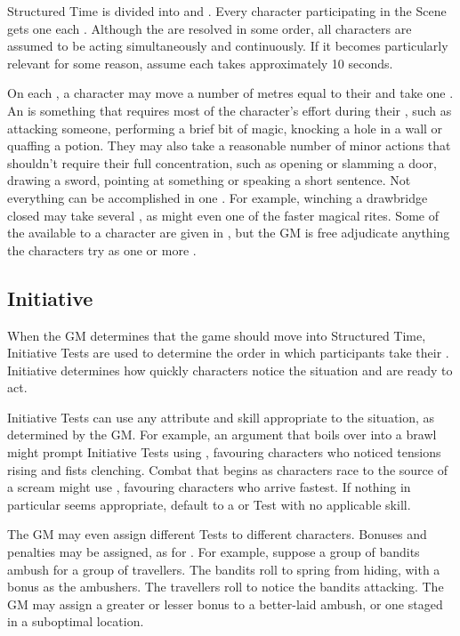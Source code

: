 Structured Time is divided into {\rounds} and {\turns}.
Every character participating in the Scene gets one {\turn} each {\round}.
Although the {\turns} are resolved in some order, all characters are assumed to be acting simultaneously and continuously.
If it becomes particularly relevant for some reason, assume each {\round} takes approximately 10 seconds.

On each {\turn}, a character may move a number of metres equal to their  and take one {\action}.
An {\action} is something that requires most of the character's effort during their {\turn}, such as attacking someone, performing a brief bit of magic, knocking a hole in a wall or quaffing a potion.
They may also take a reasonable number of minor actions that shouldn't require their full concentration, such as opening or slamming a door, drawing a sword, pointing at something or speaking a short sentence.
Not everything can be accomplished in one {\action}.
For example, winching a drawbridge closed may take several {\actions}, as might even one of the faster magical rites.
Some of the {\actions} available to a character are given in , but the GM is free adjudicate anything the characters try as one or more {\actions}.

\subsection{Initiative}

When the GM determines that the game should move into Structured Time, Initiative Tests are used to determine the order in which participants take their {\turns}.
Initiative determines how quickly characters notice the situation and are ready to act.

Initiative Tests can use any attribute and skill appropriate to the situation, as determined by the GM.
For example, an argument that boils over into a brawl might prompt Initiative Tests using , favouring characters who noticed tensions rising and fists clenching.
Combat that begins as characters race to the source of a scream might use , favouring characters who arrive fastest.
If nothing in particular seems appropriate, default to a  or  Test with no applicable skill.

The GM may even assign different Tests to different characters.
Bonuses and penalties may be assigned, as for {\opposedtests}.
For example, suppose a group of bandits ambush for a group of travellers.
The bandits roll  to spring from hiding, with a  bonus as the ambushers.
The travellers roll  to notice the bandits attacking.
The GM may assign a greater or lesser bonus to a better-laid ambush, or one staged in a suboptimal location.

